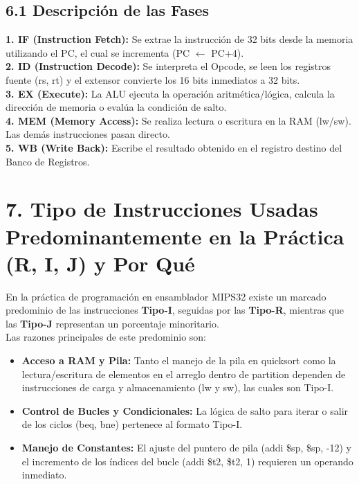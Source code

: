 \documentclass[12pt,a4paper]{article}
\begin{document}
\subsection*{6.1 Descripción de las Fases}
\textbf{1. IF (Instruction Fetch):} Se extrae la instrucción de 32 bits desde la memoria utilizando el PC, el cual se incrementa (PC $\leftarrow$ PC+4).\\
\textbf{2. ID (Instruction Decode):} Se interpreta el Opcode, se leen los registros fuente (rs, rt) y el extensor convierte los 16 bits inmediatos a 32 bits.\\
\textbf{3. EX (Execute):} La ALU ejecuta la operación aritmética/lógica, calcula la dirección de memoria o evalúa la condición de salto.\\
\textbf{4. MEM (Memory Access):} Se realiza lectura o escritura en la RAM (lw/sw). Las demás instrucciones pasan directo.\\
\textbf{5. WB (Write Back):} Escribe el resultado obtenido en el registro destino del Banco de Registros.

\section*{7. Tipo de Instrucciones Usadas Predominantemente en la Práctica (R, I, J) y Por Qué}
En la práctica de programación en ensamblador MIPS32 existe un marcado predominio de las instrucciones \textbf{Tipo-I}, seguidas por las \textbf{Tipo-R}, mientras que las \textbf{Tipo-J} representan un porcentaje minoritario.\\
Las razones principales de este predominio son:
\begin{itemize}
    \item \textbf{Acceso a RAM y Pila:} Tanto el manejo de la pila en quicksort como la lectura/escritura de elementos en el arreglo dentro de partition dependen de instrucciones de carga y almacenamiento (lw y sw), las cuales son Tipo-I.
    \item \textbf{Control de Bucles y Condicionales:} La lógica de salto para iterar o salir de los ciclos (beq, bne) pertenece al formato Tipo-I.
    \item \textbf{Manejo de Constantes:} El ajuste del puntero de pila (addi \$sp, \$sp, -12) y el incremento de los índices del bucle (addi \$t2, \$t2, 1) requieren un operando inmediato.
\end{itemize}
\end{document}
